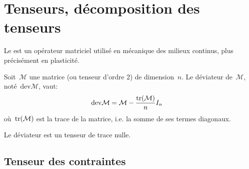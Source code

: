 \medskip
\section{Tenseurs, décomposition des tenseurs}

Le  est un opérateur matriciel utilisé en mécanique des milieux continus,
plus précisément en plasticité.

\medskip
Soit~$\mathcal{M}$ une matrice (ou tenseur d'ordre 2) de dimension~$n$.
Le déviateur de~$\mathcal{M}$, noté~$\mathrm{dev} \mathcal{M}$, vaut:
\begin{equation}  \mathrm{dev} \mathcal{M}=\mathcal{M}-\frac{\operatorname{tr}(\mathcal{M})}{n}I_n \end{equation}
où~$\operatorname{tr}(\mathcal{M})$ est la trace de la matrice, i.e. la somme de ses termes
diagonaux.

\medskip
Le déviateur est un tenseur de trace nulle.

\medskip
\subsection{Tenseur des contraintes}\label{Sec-TensS}


